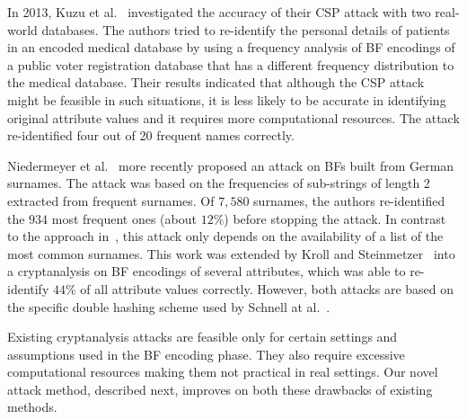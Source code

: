 \documentclass{llncs}
\begin{document}
In 2013, Kuzu et al.~\cite{Kuz13} investigated the accuracy of their
CSP attack with two real-world databases. The authors tried to
re-identify the personal details of patients in an encoded medical
database by using a frequency analysis of BF encodings of a public
voter registration database that has a different frequency
distribution to the medical database. Their results indicated that
although the CSP attack might be feasible in such situations, it is
less likely to be accurate in identifying original attribute
values and it requires more computational resources. The attack
re-identified four out of 20 frequent names correctly.


Niedermeyer et al.~\cite{Nie14} more recently proposed an attack on
BFs built from German surnames. The attack was based on the
frequencies of sub-strings of length 2 extracted from frequent
surnames. Of $7,580$ surnames, the authors re-identified the $934$
most frequent ones (about $12\%$) before stopping the attack. In
contrast to the approach in~\cite{Kuz13}, this attack only 
depends on the availability of a list of the most common surnames.
This work was extended by Kroll and Steinmetzer~\cite{Kro15} into a
cryptanalysis on BF encodings of several attributes, which was able
to re-identify $44\%$ of all attribute values correctly. However, both
attacks are based on the specific double hashing scheme used by
Schnell at al.~\cite{Sch09}.

Existing cryptanalysis attacks are feasible only for certain
settings and assumptions used in the BF encoding phase. They also
require excessive computational resources making them not practical
in real settings. Our novel attack method, described next, improves
on both these drawbacks of existing methods.

\end{document}
